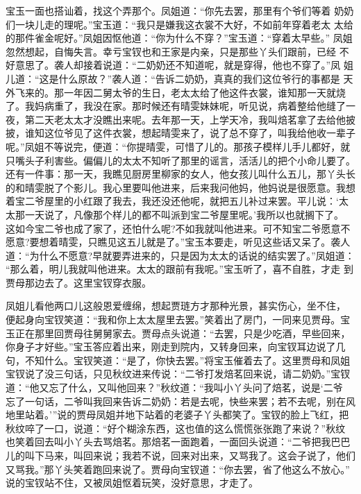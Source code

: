 宝玉一面也搭讪着，找这个弄那个。凤姐道：“你先去罢，那里有个爷们等着
奶奶们一块儿走的理呢。”宝玉道：“我只是嫌我这衣裳不大好，不如前年穿着老太
太给的那件雀金呢好。”凤姐因怄他道：“你为什么不穿？”宝玉道：“穿着太早些。”
凤姐忽然想起，自悔失言。幸亏宝钗也和王家是内亲，只是那些丫头们跟前，已经
不好意思了。袭人却接着说道：“二奶奶还不知道呢，就是穿得，他也不穿了。”凤
姐儿道：“这是什么原故？”袭人道：“告诉二奶奶，真真的我们这位爷行的事都是
天外飞来的。那一年因二舅太爷的生日，老太太给了他这件衣裳，谁知那一天就烧
了。我妈病重了，我没在家。那时候还有晴雯妹妹呢，听见说，病着整给他缝了一
夜，第二天老太太才没瞧出来呢。去年那一天，上学天冷，我叫焙茗拿了去给他披
披，谁知这位爷见了这件衣裳，想起晴雯来了，说了总不穿了，叫我给他收一辈子
呢。”凤姐不等说完，便道：“你提晴雯，可惜了儿的。那孩子模样儿手儿都好，就
只嘴头子利害些。偏偏儿的太太不知听了那里的谣言，活活儿的把个小命儿要了。
还有一件事：那一天，我瞧见厨房里柳家的女人，他女孩儿叫什么五儿，那丫头长
的和晴雯脱了个影儿。我心里要叫他进来，后来我问他妈，他妈说是很愿意。我想
着宝二爷屋里的小红跟了我去，我还没还他呢，就把五儿补过来罢。平儿说：‘太
太那一天说了，凡像那个样儿的都不叫派到宝二爷屋里呢。’我所以也就搁下了。
这如今宝二爷也成了家了，还怕什么呢?不如我就叫他进来。可不知宝二爷愿意不
愿意?要想着晴雯，只瞧见这五儿就是了。”宝玉本要走，听见这些话又呆了。袭人
道：“为什么不愿意?早就要弄进来的，只是因为太太的话说的结实罢了。”凤姐道：
“那么着，明儿我就叫他进来。太太的跟前有我呢。”宝玉听了，喜不自胜，才走
到贾母那边去了。这里宝钗穿衣服。

凤姐儿看他两口儿这般恩爱缠绵，想起贾琏方才那种光景，甚实伤心，坐不住，
便起身向宝钗笑道：“我和你上太太屋里去罢。”笑着出了房门，一同来见贾母。宝
玉正在那里回贾母往舅舅家去。贾母点头说道：“去罢，只是少吃酒，早些回来，
你身子才好些。”宝玉答应着出来，刚走到院内，又转身回来，向宝钗耳边说了几
句，不知什么。宝钗笑道：“是了，你快去罢。”将宝玉催着去了。这里贾母和凤姐
宝钗说了没三句话，只见秋纹进来传说：“二爷打发焙茗回来说，请二奶奶。”宝钗
道：“他又忘了什么，又叫他回来？”秋纹道：“我叫小丫头问了焙茗，说是‘二爷
忘了一句话，二爷叫我回来告诉二奶奶：若是去呢，快些来罢；若不去呢，别在风
地里站着。’”说的贾母凤姐并地下站着的老婆子丫头都笑了。宝钗的脸上飞红，把
秋纹啐了一口，说道：“好个糊涂东西，这也值的这么慌慌张张跑了来说？”秋纹
也笑着回去叫小丫头去骂焙茗。那焙茗一面跑着，一面回头说道：“二爷把我巴巴
儿的叫下马来，叫回来说；我若不说，回来对出来，又骂我了。这会子说了，他们
又骂我。”那丫头笑着跑回来说了。贾母向宝钗道：“你去罢，省了他这么不放心。”
说的宝钗站不住，又被凤姐怄着玩笑，没好意思，才走了。

